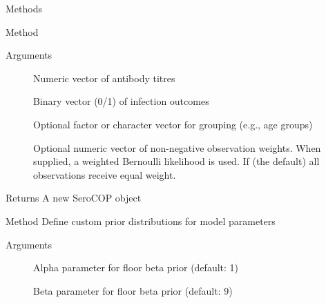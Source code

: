 \documentclass[a4paper]{book}
\begin{document}
\begin{Section}{Methods}
\begin{SubSection}{Method }
%
\begin{SubSubSection}{Arguments}

\begin{description}

\item[] Numeric vector of antibody titres

\item[] Binary vector (0/1) of infection outcomes

\item[] Optional factor or character vector for grouping (e.g., age groups)

\item[] Optional numeric vector of non-negative observation weights.
When supplied, a weighted Bernoulli likelihood is used.
If  (the default) all observations receive equal weight.

\end{description}


\end{SubSubSection}

%
\begin{SubSubSection}{Returns}
A new SeroCOP object
\end{SubSubSection}

\end{SubSection}



\hypertarget{method-SeroCOP-definePrior}{}
%
\begin{SubSection}{Method }
Define custom prior distributions for model parameters
%


%
\begin{SubSubSection}{Arguments}

\begin{description}

\item[] Alpha parameter for floor beta prior (default: 1)

\item[] Beta parameter for floor beta prior (default: 9)


\end{description}
\end{SubSubSection}
\end{SubSection}
\end{Section}
\end{document}
